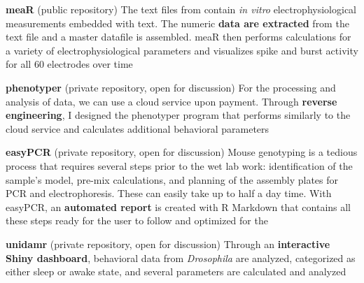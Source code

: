 \documentclass[
  a4paper, 
   maincolor=cvblue,
   sectioncolor=cvblue,
]{fortysecondscv}
\begin{document}
\textbf{meaR} (public repository) \newline
The text files from \href{https://www.multichannelsystems.com/products/vitro-mea-systems}{\color{blue}{Multi-Electrode Arrays}} contain \emph{in vitro} electrophysiological measurements embedded with text.  The numeric \textbf{data are extracted} from the text file and a master datafile is assembled. meaR then performs calculations for a variety of electrophysiological parameters and visualizes spike and burst activity for all 60 electrodes over time \newline

\textbf{phenotyper} (private repository, open for discussion) \newline
For the processing and analysis of \href{https://www.sylics.com/bioinformatics/cognitionwall/}{\color{blue}{Phenotyper}} data, we can use a cloud service upon payment. Through \textbf{reverse engineering}, I designed the phenotyper program that performs similarly to the cloud service and calculates additional behavioral parameters \newline

\textbf{easyPCR} (private repository, open for discussion) \newline
Mouse genotyping is a tedious process that requires several steps prior to the wet lab work:  identification of the sample's model, pre-mix calculations, and planning of the assembly plates for PCR and electrophoresis. These can easily take up to half a day time. With easyPCR, an \textbf{automated report} is created with R Markdown that contains all these steps ready for the user to follow and optimized for the \href{https://www.qiagen.com/us/service-and-support/learning-hub/technologies-and-research-topics/sample-quality-control/instruments/qiaxcel-advanced/}{\color{blue}{QIAxcel apparatus}} \newline

\textbf{unidamr} (private repository, open for discussion) \newline
Through an \textbf{interactive Shiny dashboard}, behavioral data from \emph{Drosophila} are analyzed, categorized as either sleep or awake state, and several parameters are calculated and analyzed

\newpage
\makebacksidebar

\end{document}
